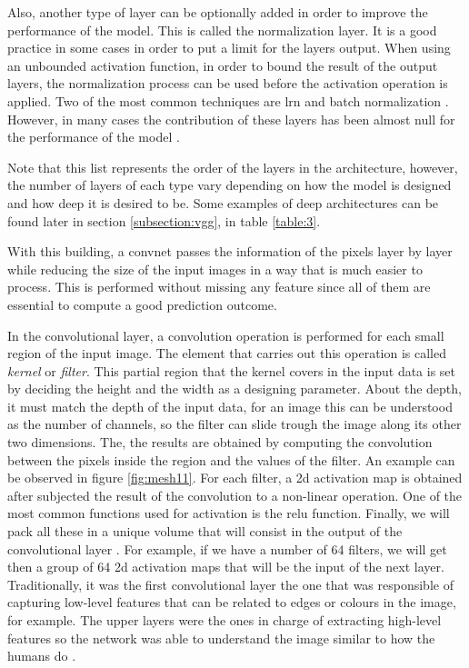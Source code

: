 	Also, another type of layer can be optionally added in order to improve the performance of the model. This is called the normalization layer. It is a good practice in some cases in order to put a limit for the layers output. When using an unbounded activation function, in order to bound the result of the output layers, the normalization process can be used before the activation operation is applied. Two of the most common techniques are \acrfull{lrn} and batch normalization \cite{Anwar2019}. However, in many cases the contribution of these layers has been almost null for the performance of the model \cite{Karpathy2016}.
	
	Note that this list represents the order of the layers in the architecture, however, the number of layers of each type vary depending on how the model is designed and how deep it is desired to be. Some examples of deep architectures can be found later in section \ref{subsection:vgg}, in table \ref{table:3}.
	
	With this building, a \acrlong{convnet} passes the information of the pixels layer by layer while reducing the size of the input images in a way that is much easier to process. This is performed without missing any feature since all of them are essential to compute a good prediction outcome.
	
	In the convolutional layer, a convolution operation is performed for each small region of the input image. The element that carries out this operation is called \textit{kernel} or \textit{filter}. This partial region that the kernel covers in the input data is set by deciding the height and the width as a designing parameter. About the depth, it must match the depth of the input data, for an image this can be understood as the number of channels, so the filter can slide trough the image along its other two dimensions. The, the results are obtained by computing the convolution between the pixels inside the region and the values of the filter. An example can be observed in figure \ref{fig:mesh11}. For each filter, a 2\acrshort{d} activation map is obtained after subjected the result of the convolution to a non-linear operation. One of the most common functions used for activation is the \acrfull{relu} function. Finally, we will pack all these in a unique volume that will consist in the output of the convolutional layer \cite{Karpathy2016}. For example, if we have a number of 64 filters, we will get then a group of 64 2\acrshort{d} activation maps that will be the input of the next layer. Traditionally, it was the first convolutional layer the one that was responsible of capturing low-level features that can be related to edges or colours in the image, for example. The upper layers were the ones in charge of extracting high-level features so the network was able to understand the image similar to how the humans do \cite{Saha2018}.
	
